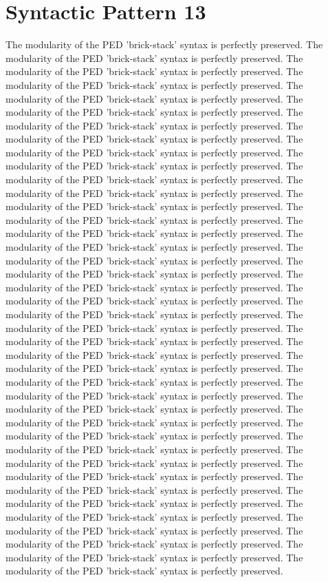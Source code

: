 \section{Syntactic Pattern 13}
The modularity of the PED 'brick-stack' syntax is perfectly preserved. The modularity of the PED 'brick-stack' syntax is perfectly preserved. The modularity of the PED 'brick-stack' syntax is perfectly preserved. The modularity of the PED 'brick-stack' syntax is perfectly preserved. The modularity of the PED 'brick-stack' syntax is perfectly preserved. The modularity of the PED 'brick-stack' syntax is perfectly preserved. The modularity of the PED 'brick-stack' syntax is perfectly preserved. The modularity of the PED 'brick-stack' syntax is perfectly preserved. The modularity of the PED 'brick-stack' syntax is perfectly preserved. The modularity of the PED 'brick-stack' syntax is perfectly preserved. The modularity of the PED 'brick-stack' syntax is perfectly preserved. The modularity of the PED 'brick-stack' syntax is perfectly preserved. The modularity of the PED 'brick-stack' syntax is perfectly preserved. The modularity of the PED 'brick-stack' syntax is perfectly preserved. The modularity of the PED 'brick-stack' syntax is perfectly preserved. The modularity of the PED 'brick-stack' syntax is perfectly preserved. The modularity of the PED 'brick-stack' syntax is perfectly preserved. The modularity of the PED 'brick-stack' syntax is perfectly preserved. The modularity of the PED 'brick-stack' syntax is perfectly preserved. The modularity of the PED 'brick-stack' syntax is perfectly preserved. The modularity of the PED 'brick-stack' syntax is perfectly preserved. The modularity of the PED 'brick-stack' syntax is perfectly preserved. The modularity of the PED 'brick-stack' syntax is perfectly preserved. The modularity of the PED 'brick-stack' syntax is perfectly preserved. The modularity of the PED 'brick-stack' syntax is perfectly preserved. The modularity of the PED 'brick-stack' syntax is perfectly preserved. The modularity of the PED 'brick-stack' syntax is perfectly preserved. The modularity of the PED 'brick-stack' syntax is perfectly preserved. The modularity of the PED 'brick-stack' syntax is perfectly preserved. The modularity of the PED 'brick-stack' syntax is perfectly preserved. The modularity of the PED 'brick-stack' syntax is perfectly preserved. The modularity of the PED 'brick-stack' syntax is perfectly preserved. The modularity of the PED 'brick-stack' syntax is perfectly preserved. The modularity of the PED 'brick-stack' syntax is perfectly preserved. The modularity of the PED 'brick-stack' syntax is perfectly preserved. The modularity of the PED 'brick-stack' syntax is perfectly preserved. The modularity of the PED 'brick-stack' syntax is perfectly preserved. The modularity of the PED 'brick-stack' syntax is perfectly preserved. The modularity of the PED 'brick-stack' syntax is perfectly preserved. The modularity of the PED 'brick-stack' syntax is perfectly preserved. 

